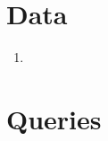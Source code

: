 \documentclass[11pt]{article}
\begin{document}
\section{Data}
    \begin{enumerate}
        \item

    \end{enumerate}

\section{Queries}
\end{document}
